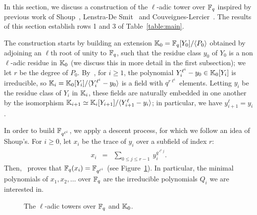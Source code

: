 \documentclass{sig-alternate}
\begin{document}
In this section, we discuss a construction of the $\ell$-adic tower
over $\mathbb{F}_q$ inspired by previous work of Shoup~\cite{Shoup90,shoup94},
Lenstra-De Smit~\cite{lenstra+desmit08-stdmodels} and
Couveignes-Lercier~\cite{couveignes+lercier11}. The results of this
section establish rows 1 and 3 of Table~\ref{table:main}.


The construction starts by building an extension $\mathbb{K}_0 =
\mathbb{F}_q[Y_0]/\langle P_0 \rangle$ obtained by adjoining an $\ell$th root
of unity to $\mathbb{F}_q$, such that the residue class $y_0$ of $Y_0$ is a
non $\ell$-adic residue in $\mathbb{K}_0$ (we discuss this in more detail in
the first subsection); we let $r$ be the degree of $P_0$.
By~\cite[Th.~VI.9.1]{lang}, for $i\ge 1$, the polynomial
$Y_i^{\ell^i}-y_0 \in \mathbb{K}_0[Y_i]$ is irreducible, so $\mathbb{K}_i=
\mathbb{K}_0[Y_i]/\langle Y_i^{\ell^i}-y_0\rangle$ is a field with $q^{r
  \ell^i}$ elements.  Letting $y_i$ be the residue class of $Y_i$ in
$\mathbb{K}_i$, these fields are naturally embedded in one another by the
isomorphism $\mathbb{K}_{i+1} \simeq \mathbb{K}_i[Y_{i+1}]/\langle
Y_{i+1}^\ell-y_i\rangle$; in particular, we have
$y_{i+1}^\ell=y_i$.


In order to build $\mathbb{F}_{q^{\ell^i}}$, we apply a descent process, for
which we follow an idea of Shoup's. For $i \ge 0$, let $x_i$ be the
trace of $y_i$ over a subfield of index $r$:
$$\begin{array}{ccc}
x_i &=& \sum_{0 \le j \le r-1}\ y_i^{q^{\ell^i j}}.  
\end{array}$$
Then,~\cite[Th.~2.1]{Shoup90} proves that $\mathbb{F}_q(x_i)=\mathbb{F}_{q^{\ell^i}}$
(see Figure~\ref{fig:ladic}). In particular,
the minimal polynomials of $x_1,x_2,\dots$ over $\mathbb{F}_q$ are
the irreducible polynomials $Q_i$ we are interested in.

\begin{figure}[h]
  \centering
  \vspace{-0.3cm}
  \caption{The $\ell$-adic towers over $\mathbb{F}_q$ and $\mathbb{K}_0$.}\vspace{-0.5cm}
  \label{fig:ladic}
\end{figure}
\end{document}
